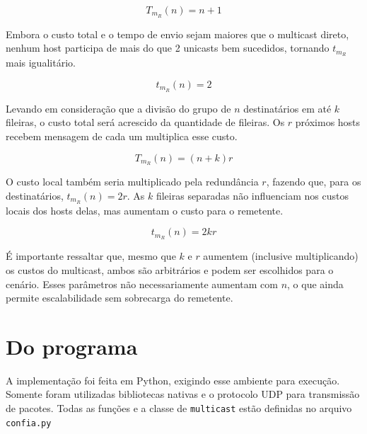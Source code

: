 \documentclass[12pt,twocolumn]{article}
\begin{document}
					\begin{equation} \label{eq:multicast_row}
						T_{m_R} (n) = n + 1
					\end{equation}	
				
					Embora o custo total e o tempo de envio sejam maiores que o multicast direto, nenhum host participa de mais do que 2 unicasts bem sucedidos, tornando $t_{m_R}$ mais igualitário.
					
					\begin{equation} \label{eq:multicast_row_local}
						t_{m_R} (n) = 2
					\end{equation}									
				
					Levando em consideração que a divisão do grupo de $n$ destinatários em até $k$ fileiras, o custo total será acrescido da quantidade de fileiras.	
					Os $r$ próximos hosts recebem mensagem de cada um multiplica esse custo.
					
					\begin{equation} \label{eq:multicast_row_safe}
						T_{m_R} (n) = (n + k)r
					\end{equation}
				
					O custo local também seria multiplicado pela redundância $r$, fazendo que, para os destinatários, $t_{m_R} (n) = 2r$.
					As $k$ fileiras separadas não influenciam nos custos locais dos hosts delas, mas aumentam o custo para o remetente.
			
					\begin{equation} \label{eq:multicast_row_safe_local}
						t_{m_R} (n) = 2kr
					\end{equation}
				
					É importante ressaltar que, mesmo que $k$ e $r$ aumentem (inclusive multiplicando) os custos do multicast, ambos são arbitrários e podem ser escolhidos para o cenário.
					Esses parâmetros não necessariamente aumentam com $n$, o que ainda permite escalabilidade sem sobrecarga do remetente.
					
					
	\section{Do programa}			
	
		A implementação foi feita em Python, exigindo esse ambiente para execução.
		Somente foram utilizadas bibliotecas nativas e o protocolo UDP para transmissão de pacotes. 
		Todas as funções e a classe de \texttt{multicast} estão definidas no arquivo \texttt{confia.py}
		
\end{document}
